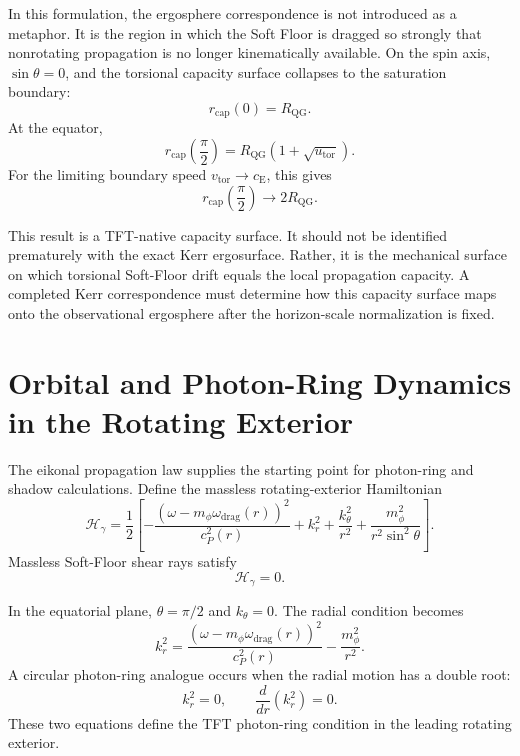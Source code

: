 In this formulation, the ergosphere correspondence is not introduced as a metaphor. It is the region in which the Soft Floor is dragged so strongly that nonrotating propagation is no longer kinematically available. On the spin axis, \(\sin\theta=0\), and the torsional capacity surface collapses to the saturation boundary:
\begin{equation}
    r_{\mathrm{cap}}(0)
    =
    R_{\mathrm{QG}} .
\end{equation}
At the equator,
\begin{equation}
    r_{\mathrm{cap}}
    \left(\frac{\pi}{2}\right)
    =
    R_{\mathrm{QG}}
    \left(
    1+
    \sqrt{u_{\mathrm{tor}}}
    \right).
\end{equation}
For the limiting boundary speed \(v_{\mathrm{tor}}\rightarrow c_{\mathrm{E}}\), this gives
\begin{equation}
    r_{\mathrm{cap}}
    \left(\frac{\pi}{2}\right)
    \rightarrow
    2R_{\mathrm{QG}} .
\end{equation}

This result is a TFT-native capacity surface. It should not be identified prematurely with the exact Kerr ergosurface. Rather, it is the mechanical surface on which torsional Soft-Floor drift equals the local propagation capacity. A completed Kerr correspondence must determine how this capacity surface maps onto the observational ergosphere after the horizon-scale normalization is fixed.

\section{Orbital and Photon-Ring Dynamics in the Rotating Exterior}

The eikonal propagation law supplies the starting point for photon-ring and shadow calculations. Define the massless rotating-exterior Hamiltonian
\begin{equation}
    \mathcal{H}_{\gamma}
    =
    \frac{1}{2}
    \left[
    -
    \frac{
    \left(
    \omega
    -
    m_{\phi}\omega_{\mathrm{drag}}(r)
    \right)^2
    }{
    c_P^2(r)
    }
    +
    k_r^2
    +
    \frac{k_{\theta}^2}{r^2}
    +
    \frac{m_{\phi}^2}{r^2\sin^2\theta}
    \right].
\end{equation}
Massless Soft-Floor shear rays satisfy
\begin{equation}
    \mathcal{H}_{\gamma}=0.
\end{equation}

In the equatorial plane, \(\theta=\pi/2\) and \(k_{\theta}=0\). The radial condition becomes
\begin{equation}
    k_r^2
    =
    \frac{
    \left(
    \omega
    -
    m_{\phi}\omega_{\mathrm{drag}}(r)
    \right)^2
    }{
    c_P^2(r)
    }
    -
    \frac{m_{\phi}^2}{r^2} .
\end{equation}
A circular photon-ring analogue occurs when the radial motion has a double root:
\begin{equation}
    k_r^2=0,
    \qquad
    \frac{d}{dr}
    \left(k_r^2\right)=0 .
\end{equation}
These two equations define the TFT photon-ring condition in the leading rotating exterior.

